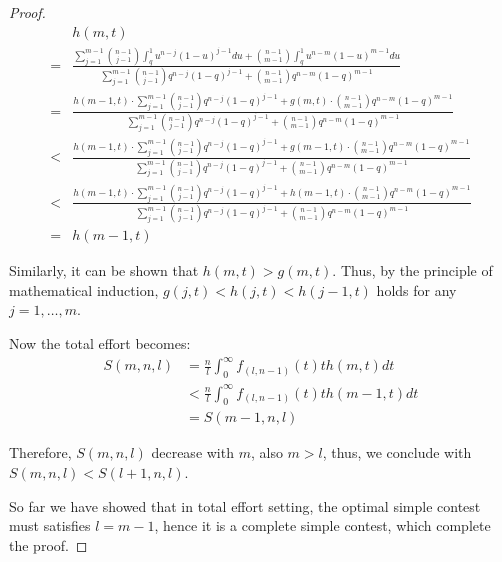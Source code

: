 \begin{proof}
    $$
\begin{aligned}
& h(m,t)  \\ = &\frac{\sum_{j=1}^{m-1} \binom{n-1}{j-1}\int_q^1 u^{n-j}(1-u)^{j-1}du+\binom{n-1}{m-1}\int_q^1 u^{n-m}(1-u)^{m-1}du}{\sum_{j=1}^{m-1} \binom{n-1}{j-1} q^{n-j} (1-q)^{j-1}+\binom{n-1}{m-1} q^{n-m} (1-q)^{m-1}} \\ =&\frac{h(m-1,t)\cdot \sum_{j=1}^{m-1} \binom{n-1}{j-1} q^{n-j} (1-q)^{j-1}+g(m,t)\cdot \binom{n-1}{m-1} q^{n-m} (1-q)^{m-1}}{\sum_{j=1}^{m-1} \binom{n-1}{j-1} q^{n-j} (1-q)^{j-1}+\binom{n-1}{m-1} q^{n-m} (1-q)^{m-1}} \\ <&\frac{h(m-1,t)\cdot \sum_{j=1}^{m-1} \binom{n-1}{j-1} q^{n-j} (1-q)^{j-1}+g(m-1,t)\cdot \binom{n-1}{m-1} q^{n-m} (1-q)^{m-1}}{\sum_{j=1}^{m-1} \binom{n-1}{j-1} q^{n-j} (1-q)^{j-1}+\binom{n-1}{m-1} q^{n-m} (1-q)^{m-1}} \\ <&\frac{h(m-1,t)\cdot \sum_{j=1}^{m-1} \binom{n-1}{j-1} q^{n-j} (1-q)^{j-1}+h(m-1,t)\cdot \binom{n-1}{m-1} q^{n-m} (1-q)^{m-1}}{\sum_{j=1}^{m-1}\binom{n-1}{j-1} q^{n-j} (1-q)^{j-1}+\binom{n-1}{m-1} q^{n-m} (1-q)^{m-1}} \\=&h(m-1,t)
\end{aligned}
$$

Similarly, it can be shown that $h(m,t)>g(m,t)$. Thus, by the principle of mathematical induction, $g(j,t)<h(j,t)<h(j-1,t)$ holds for any $j=1,\ldots,m$.

Now the total effort becomes: 
$$
\begin{aligned}
S(m, n, l) & = \frac{n}{l}\int_0^\infty f_{(l,n-1)}(t)t h(m,t)dt \\ &< \frac{n}{l}\int_0^\infty f_{(l,n-1)}(t)t h(m-1,t)dt
\\ &= S(m-1,n,l)
\end{aligned}
$$

Therefore, $S(m,n,l)$ decrease with $m$, also $m>l$, thus, we conclude with $S(m,n,l)<S(l+1,n,l)$. 

So far we have showed that in total effort setting, the optimal simple contest must satisfies $l=m-1$, hence it is a complete simple contest, which complete the proof.
\end{proof}

